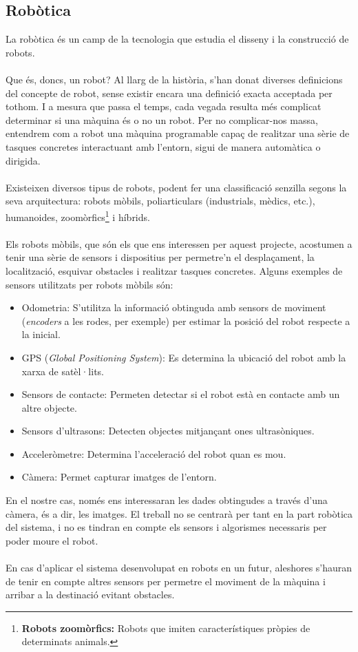 	\subsection{Robòtica}
		La robòtica és un camp de la tecnologia que estudia el disseny i la construcció de robots.\\\\
		Que és, doncs, un robot? Al llarg de la història, s'han donat diverses definicions del concepte de robot, sense existir encara una definició exacta acceptada per tothom. I a mesura que passa el temps,
		cada vegada resulta més complicat determinar si una màquina és o no un robot. Per no complicar-nos massa, entendrem com a robot una màquina programable capaç de realitzar una sèrie de
		tasques concretes interactuant amb l'entorn, sigui de manera automàtica o dirigida.\\\\
		Existeixen diversos tipus de robots, podent fer una classificació senzilla segons la seva arquitectura: robots mòbils, poliarticulars (industrials, mèdics, etc.), humanoides, 
		zoomòrfics\footnote{\textbf{Robots zoomòrfics:} Robots que imiten característiques pròpies de determinats animals.} i híbrids.\\\\
		Els robots mòbils, que són els que ens interessen per aquest projecte, acostumen a tenir una sèrie de sensors i dispositius per permetre'n el desplaçament, la localització, esquivar obstacles i
		realitzar tasques concretes. Alguns exemples de sensors utilitzats per robots mòbils són:\\
		\begin{itemize}
			\item Odometria: S'utilitza la informació obtinguda amb sensors de moviment (\textit{encoders} a les rodes, per exemple) per estimar la posició del robot respecte a la inicial.
			\item GPS (\textit{Global Positioning System}): Es determina la ubicació del robot amb la xarxa de satèl·lits.
			\item Sensors de contacte: Permeten detectar si el robot està en contacte amb un altre objecte.
			\item Sensors d'ultrasons: Detecten objectes mitjançant ones ultrasòniques.
			\item Acceleròmetre: Determina l'acceleració del robot quan es mou. 
			\item Càmera: Permet capturar imatges de l'entorn.\\
		\end{itemize}
		En el nostre cas, només ens interessaran les dades obtingudes a través d'una càmera, és a dir, les imatges. El treball no se centrarà per tant en la part robòtica del sistema, i no es tindran en compte
		els sensors i algorismes necessaris per poder moure el robot.\\\\
		En cas d'aplicar el sistema desenvolupat en robots en un futur, aleshores s'hauran de tenir en compte altres sensors per permetre el moviment
		de la màquina i arribar a la destinació evitant obstacles.
